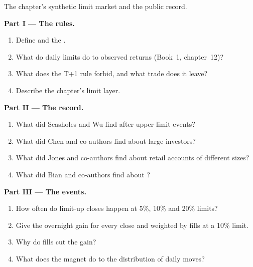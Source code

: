 \begin{problem}\label{pb:s1:asia-specific-equity-strategies:1}
The chapter's synthetic limit market and the public record.

\medskip\noindent\textbf{Part I --- The rules.}
\begin{enumerate}
\item Define  and the .
\item What do daily limits do to observed returns (Book~1, chapter~12)?
\item What does the T+1 rule forbid, and what trade does it leave?
\item Describe the chapter's limit layer.
\end{enumerate}

\medskip\noindent\textbf{Part II --- The record.}
\begin{enumerate}[resume]
\item What did Seasholes and Wu find after upper-limit events?
\item What did Chen and co-authors find about large investors?
\item What did Jones and co-authors find about retail accounts of different sizes?
\item What did Bian and co-authors find about ?
\end{enumerate}

\medskip\noindent\textbf{Part III --- The events.}
\begin{enumerate}[resume]
\item How often do limit-up closes happen at 5\%, 10\% and 20\% limits?
\item Give the overnight gain for every close and weighted by fills at a 10\% limit.
\item Why do fills cut the gain?
\item What does the magnet do to the distribution of daily moves?
\end{enumerate}


\end{problem}
